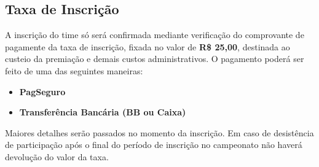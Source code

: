 \subsection{Taxa de Inscrição}

A inscrição do time só será confirmada mediante verificação do comprovante de pagamente da taxa de inscrição, fixada no valor de \textbf{R\$ 25,00}, destinada ao custeio da premiação e demais custos administrativos. O pagamento poderá ser feito de uma das seguintes maneiras:

\begin{itemize}
	\item \textbf{PagSeguro}
	\item \textbf{Transferência Bancária (BB ou Caixa)}
\end{itemize}

Maiores detalhes serão passados no momento da inscrição. Em caso de desistência de participação após o final do período de inscrição no campeonato não haverá devolução do valor da taxa.
